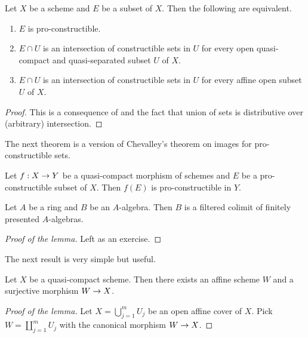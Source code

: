 \begin{corollary}\label{corollary:proconstructibleonschemes}
Let $X$ be a scheme and $E$ be a subset of $X$. Then the following are equivalent.
\begin{enumerate}[label=\emph{\textbf{(\roman*)}}, leftmargin=*]
\item $E$ is pro-constructible.
\item $E\cap U$ is an intersection of constructible sets in $U$ for every open quasi-compact and quasi-separated subset $U$ of $X$.
\item $E\cap U$ is an intersection of constructible sets in $U$ for every affine open subset $U$ of $X$.
\end{enumerate} 
\end{corollary}
\begin{proof}
This is a consequence of {\cite[Theorem 3.2]{Constructibleandlocallyconstructiblesets}} and the fact that union of sets is distributive over (arbitrary) intersection.
\end{proof}
\noindent
The next theorem is a version of Chevalley's theorem on images for pro-constructible sets.

\begin{theorem}\label{theorem:Chevalleysforproconstructible}
Let $f:X\rightarrow Y$ be a quasi-compact morphism of schemes and $E$ be a pro-constructible subset of $X$. Then $f(E)$ is pro-constructible in $Y$.
\end{theorem}

\begin{lemma}\label{lemma:everyalgebraisacolimitoffinitelypresented}
Let $A$ be a ring and $B$ be an $A$-algebra. Then $B$ is a filtered colimit of finitely presented $A$-algebras.
\end{lemma}
\begin{proof}[Proof of the lemma]
Left as an exercise.
\end{proof}
\noindent
The next result is very simple but useful.

\begin{lemma}\label{lemma:affinecoveringofqc}
Let $X$ be a quasi-compact scheme. Then there exists an affine scheme $W$ and a surjective morphism $W\rightarrow X$.
\end{lemma}
\begin{proof}[Proof of the lemma]
Let $X = \bigcup_{j=1}^mU_j$ be an open affine cover of $X$. Pick $W = \coprod_{j=1}^mU_j$ with the canonical morphism $W\rightarrow X$.
\end{proof}

